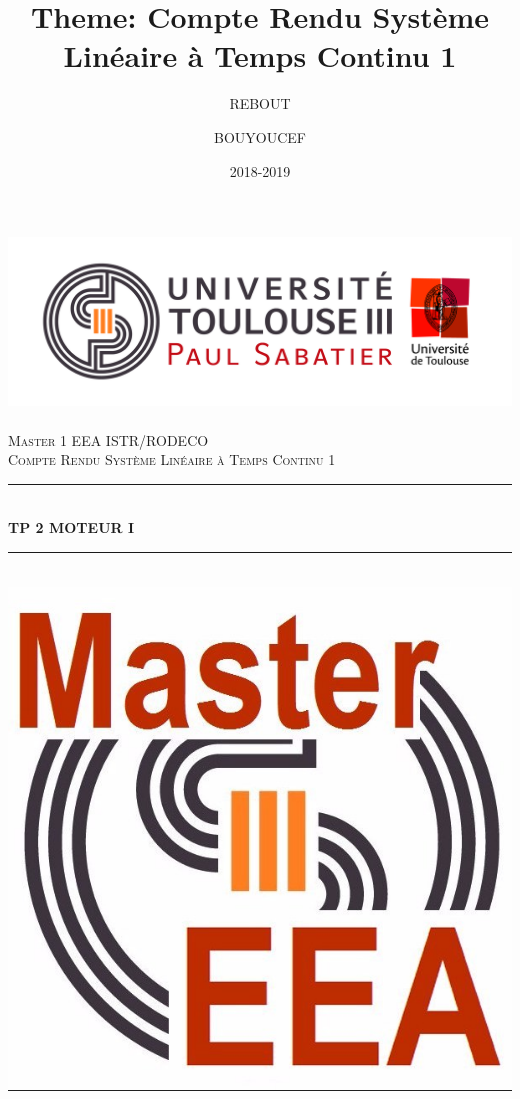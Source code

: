 \documentclass[12pt, a4paper, openany]{report}
\title{Theme: Compte Rendu Système Linéaire à Temps Continu 1}
\author{REBOUT \bsc{Mehenna}}
\author{BOUYOUCEF \bsc{Farid}}
\date{2018-2019}
\newcommand{\HRule}{\rule{\linewidth}{0.5mm}}
\begin{document}

\makeatletter
  \begin{titlepage}
  

  \begin{sffamily}
   \begin{center}

    \includegraphics[scale=0.5]{Logo_UT3.jpg}~\\[1.5cm]

    \textsc{\LARGE Master 1 EEA ISTR/RODECO  }\\[2cm]

    \textsc{\Large Compte Rendu  Système Linéaire à Temps Continu 1}\\[1.5cm]

    \HRule \\[0.4cm] %
    { \huge \bfseries TP 2 MOTEUR I\\[0.4cm] }

    \HRule \\[1cm]   %
    \includegraphics[scale=0.1]{logomaster.jpg}
    \\[1cm]


\end{center}
\end{sffamily}
\end{titlepage}
\end{document}

